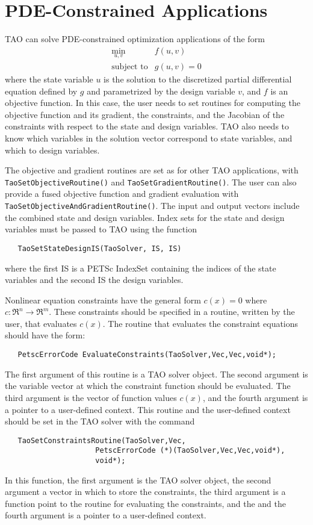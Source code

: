 \section{PDE-Constrained Applications}\label{sec:pde_applications}
TAO can solve PDE-constrained optimization applications 
of the form
\[
\begin{array}{ll}
\displaystyle \min_{u,v} & f(u,v) \\
\mbox{subject to} & g(u,v) = 0
\end{array}
\]
where the state variable $u$ is the solution to the discretized partial 
differential equation defined by $g$ and parametrized by the design 
variable $v$, and $f$ is an objective function.  In this case, the 
user needs to set routines for computing the objective function
and its gradient, the constraints, and the Jacobian of the constraints
with respect to the state and design variables.  TAO also needs to know 
which variables in the solution vector correspond to state variables, 
and which to design variables.

The objective and gradient routines are set as for other TAO applications,
with {\tt Tao\-Set\-Object\-ive\-Routine()} and {\tt Tao\-Set\-Gradient\-Routine()}.  The user can also provide a fused objective function and gradient
evaluation with {\tt Tao\-Set\-Objective\-And\-Gradient\-Routine()}.
The input and output vectors include the combined state and design 
variables.  Index sets for the state and design variables must be 
passed to TAO using the function
\begin{verbatim}
   TaoSetStateDesignIS(TaoSolver, IS, IS)
\end{verbatim}
where the first IS is a PETSc Index\-Set containing the indices of the
state variables and the second IS the design variables.

Nonlinear equation constraints have the general form $c(x) = 0$ where 
$c: \Re^n \to \Re^m$.  These constraints should be specified in a routine, 
written by the user, that evaluates $c(x)$.  The routine that evaluates the 
constraint equations should have the form:
\begin{verbatim}
   PetscErrorCode EvaluateConstraints(TaoSolver,Vec,Vec,void*);
\end{verbatim}
\noindent
The first argument of this routine is a TAO solver object.  The second argument
is the variable vector at which the constraint function should be evaluated.  
The third argument is the vector of function values $c(x)$, and the fourth
argument is a pointer to a user-defined context.  This routine and the 
user-defined context should be set in the TAO solver with the command
\begin{verbatim}
   TaoSetConstraintsRoutine(TaoSolver,Vec,
                     PetscErrorCode (*)(TaoSolver,Vec,Vec,void*),
                     void*);
\end{verbatim}
\noindent
In this function, the first argument is the TAO solver object, the second 
argument a vector in which to store the constraints, the third argument is
a function point to the routine for evaluating the constraints, and the
and the fourth argument is a pointer to a user-defined context.

